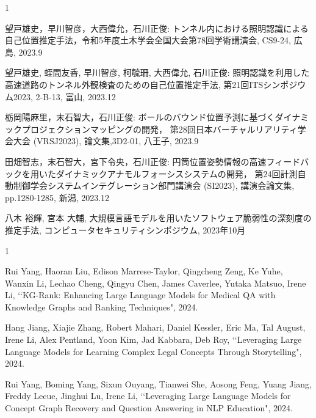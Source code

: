 \begin{発表}{1}


望戸雄史，早川智彦，大西偉允，石川正俊:  トンネル内における照明認識による自己位置推定手法，令和5年度土木学会全国大会第78回学術講演会, CS9-24, 広島, 2023.9

望戸雄史, 蛭間友香, 早川智彦, 柯毓珊, 大西偉允, 石川正俊:  照明認識を利用した高速道路のトンネル外観検査のための自己位置推定手法, 第21回ITSシンポジウム2023, 2-B-13, 富山, 2023.12

栃岡陽麻里，末石智大，石川正俊: ボールのバウンド位置予測に基づくダイナミックプロジェクションマッピングの開発， 第28回日本バーチャルリアリティ学会大会 (VRSJ2023), 論文集,3D2-01, 八王子, 2023.9

田畑智志，末石智大，宮下令央，石川正俊: 円筒位置姿勢情報の高速フィードバックを用いたダイナミックアナモルフォーシスシステムの開発， 第24回計測自動制御学会システムインテグレーション部門講演会 (SI2023), 講演会論文集, pp.1280-1285, 新潟, 2023.12


八木 裕輝, 宮本 大輔, 大規模言語モデルを用いたソフトウェア脆弱性の深刻度の推定手法, コンピュータセキュリティシンポジウム, 2023年10月





\begin{発表}{1}  %

Rui Yang, Haoran Liu, Edison Marrese-Taylor, Qingcheng Zeng, Ke Yuhe, Wanxin Li, Lechao Cheng, Qingyu Chen, James Caverlee, Yutaka Matsuo, Irene Li, \lq\lq KG-Rank: Enhancing Large Language Models for Medical QA with Knowledge Graphs and Ranking Techniques", 2024.

Hang Jiang, Xiajie Zhang, Robert Mahari, Daniel Kessler, Eric Ma, Tal August, Irene Li, Alex Pentland, Yoon Kim, Jad Kabbara, Deb Roy, \lq\lq Leveraging Large Language Models for Learning Complex Legal Concepts Through Storytelling", 2024.

Rui Yang, Boming Yang, Sixun Ouyang, Tianwei She, Aosong Feng, Yuang Jiang, Freddy Lecue, Jinghui Lu, Irene Li, \lq\lq Leveraging Large Language Models for Concept Graph Recovery and Question Answering in NLP Education", 2024.


\end{発表}
\end{発表}
